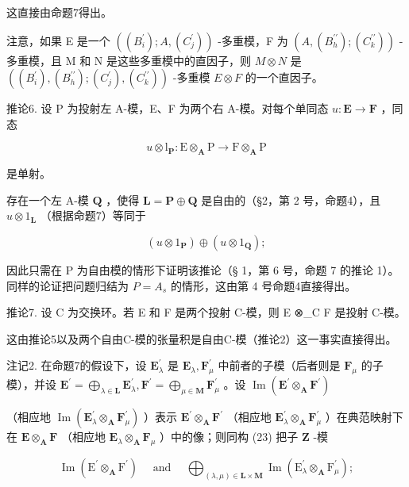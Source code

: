 这直接由命题7得出。

注意，如果 E 是一个 \(((B_{i}^{\prime}); A, (C_{j}^{\prime}))\) -多重模，F 为 \((A, (B_{h}^{\prime\prime}); (C_{k}^{\prime\prime}))\) -多重模，且 M 和 N 是这些多重模中的直因子，则 \(M \otimes N\) 是 \(((B_{i}^{\prime}), (B_{h}^{\prime\prime}); (C_{j}^{\prime}), (C_{k}^{\prime\prime}))\) -多重模 \(E \otimes F\) 的一个直因子。

推论6. 设 P 为投射左 A-模，E、F 为两个右 A-模。对每个单同态 \(u: \mathbf{E} \to \mathbf{F}\) ，同态

\[
u \otimes \mathrm{l} _ {\mathbf {P}}: \mathrm{E} \otimes_ {\mathbf {A}} \mathrm{P} \rightarrow \mathrm{F} \otimes_ {\mathbf {A}} \mathrm{P}
\]

是单射。

存在一个左 A-模 \(\mathbf{Q}\) ，使得 \(\mathbf{L} = \mathbf{P} \oplus \mathbf{Q}\) 是自由的（§2，第 2 号，命题4），且 \(u \otimes 1_{\mathbf{L}}\) （根据命题7）等同于

\[
(u \otimes 1 _ {\mathbf {P}}) \oplus (u \otimes 1 _ {\mathbf {Q}});
\]

因此只需在 P 为自由模的情形下证明该推论（§ 1，第 6 号，命题 7 的推论 1）。同样的论证把问题归结为 \(P = A_{s}\) 的情形，这由第 4 号命题4直接得出。

推论7. 设 C 为交换环。若 E 和 F 是两个投射 C-模，则 E ⊗\_C F 是投射 C-模。

这由推论5以及两个自由C-模的张量积是自由C-模（推论2）这一事实直接得出。

注记2. 在命题7的假设下，设 \(\mathbf{E}_{\lambda}^{\prime}\) 是 \(\mathbf{E}_{\lambda}, \mathbf{F}_{\mu}^{\prime}\) 中前者的子模（后者则是 \(\mathbf{F}_{\mu}\) 的子模），并设 \(\mathbf{E}^{\prime} = \bigoplus_{\lambda \in \mathbf{L}} \mathbf{E}_{\lambda}^{\prime}, \mathbf{F}^{\prime} = \bigoplus_{\mu \in \mathbf{M}} \mathbf{F}_{\mu}^{\prime}\) 。设 \(\operatorname{Im}(\mathbf{E}^{\prime} \otimes_{\mathbf{A}} \mathbf{F}^{\prime})\)

（相应地 \(\operatorname{Im}(\mathbf{E}_{\lambda}^{\prime}\otimes_{\mathbf{A}}\mathbf{F}_{\mu}^{\prime})\) ）表示 \(\mathbf{E}^{\prime}\otimes_{\mathbf{A}}\mathbf{F}^{\prime}\) （相应地 \(\mathbf{E}_{\lambda}^{\prime}\otimes_{\mathbf{A}}\mathbf{F}_{\mu}^{\prime}\) ）在典范映射下在 \(\mathbf{E}\otimes_{\mathbf{A}}\mathbf{F}\) （相应地 \(\mathbf{E}_{\lambda}\otimes_{\mathbf{A}}\mathbf{F}_{\mu}\) ）中的像；则同构 (23) 把子 \(\mathbf{Z}\) -模

\[
\operatorname{Im} \left(\mathrm{E} ^ {\prime} \otimes_ {\mathbf {A}} \mathrm{F} ^ {\prime}\right) \quad \text { and } \quad \bigoplus_ {(\lambda , \mu) \in \mathbf {L} \times \mathbf {M}} \operatorname{Im} \left(\mathrm{E} _ {\lambda} ^ {\prime} \otimes_ {\mathbf {A}} \mathrm{F} _ {\mu} ^ {\prime}\right);
\]


